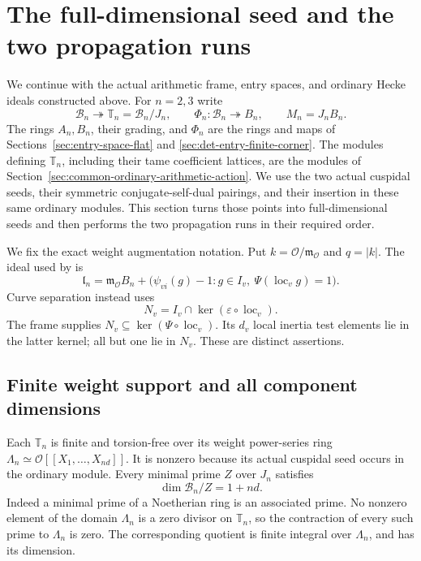 \section{The full-dimensional seed and the two propagation runs}
\label{sec:actual-seed-two-propagations}

We continue with the actual arithmetic frame, entry spaces,
and ordinary Hecke ideals constructed above.
For \(n=2,3\) write
\[
 \mathcal B_n\twoheadrightarrow
       \mathbb T_n=\mathcal B_n/J_n,\qquad
 \Phi_n:\mathcal B_n\twoheadrightarrow B_n,\qquad
 M_n=J_nB_n .
                                                               \tag{SF1}
\]
The rings \(A_n,B_n\), their grading, and \(\Phi_n\)
are the rings and maps of
Sections~\ref{sec:entry-space-flat} and
\ref{sec:det-entry-finite-corner}.
The modules defining \(\mathbb T_n\), including their
tame coefficient lattices, are the modules of
Section~\ref{sec:common-ordinary-arithmetic-action}.
We use the two actual cuspidal seeds, their symmetric
conjugate-self-dual pairings, and their insertion in
these same ordinary modules.
This section turns those points into full-dimensional
seeds and then performs the two propagation runs in
their required order.

We fix the exact weight augmentation notation.
Put \(k=\mathcal O/\mathfrak m_{\mathcal O}\) and \(q=|k|\).
The ideal used by  is
\[
 \mathfrak l_n=\mathfrak m_{\mathcal O}B_n+
   \bigl(\psi_{vi}(g)-1:
       g\in I_v,\ \Psi(\operatorname{loc}_v g)=1\bigr).
                                                               \tag{SF2}
\]
Curve separation instead uses
\[
 N_v=I_v\cap\ker(\varepsilon\circ\operatorname{loc}_v).
\]
The frame supplies \(N_v\subseteq\ker(\Psi\circ\operatorname{loc}_v)\).
Its \(d_v\) local inertia test elements lie in the latter
kernel; all but one lie in \(N_v\).
These are distinct assertions.

\subsection{Finite weight support and all component dimensions}
Each \(\mathbb T_n\) is finite and torsion-free over its
weight power-series ring
\(\Lambda_n\simeq\mathcal O[[X_1,\ldots,X_{nd}]]\).
It is nonzero because its actual cuspidal seed occurs
in the ordinary module.
Every minimal prime \(Z\) over \(J_n\) satisfies
\[
                      \dim\mathcal B_n/Z=1+nd.              \tag{SF3}
\]
Indeed a minimal prime of a Noetherian ring is an
associated prime. No nonzero element of the domain
\(\Lambda_n\) is a zero divisor on \(\mathbb T_n\),
so the contraction of every such prime to
\(\Lambda_n\) is zero. The corresponding quotient is
finite integral over \(\Lambda_n\), and has its dimension.

